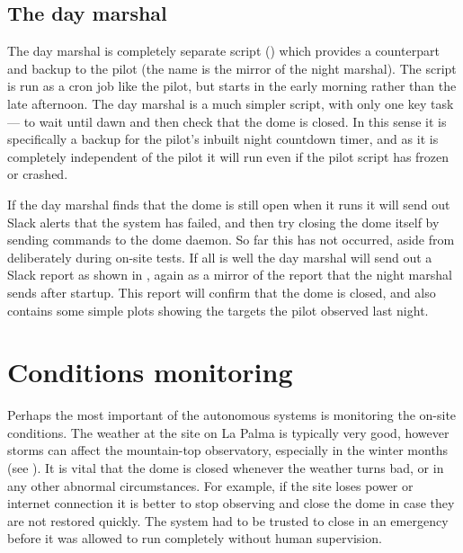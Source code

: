 
\subsection{The day marshal}
\label{sec:day_marshal}
\begin{colsection}

The day marshal is completely separate script () which provides a counterpart and backup to the pilot (the name is the mirror of the night marshal). The script is run as a cron job like the pilot, but starts in the early morning rather than the late afternoon. The day marshal is a much simpler script, with only one key task --- to wait until dawn and then check that the dome is closed. In this sense it is specifically a backup for the pilot's inbuilt night countdown timer, and as it is completely independent of the pilot it will run even if the pilot script has frozen or crashed.

If the day marshal finds that the dome is still open when it runs it will send out Slack alerts that the system has failed, and then try closing the dome itself by sending commands to the dome daemon. So far this has not occurred, aside from deliberately during on-site tests. If all is well the day marshal will send out a Slack report as shown in , again as a mirror of the report that the night marshal sends after startup. This report will confirm that the dome is closed, and also contains some simple plots showing the targets the pilot observed last night.

\end{colsection}


\section{Conditions monitoring}
\label{sec:conditions}


\begin{colsection}

Perhaps the most important of the autonomous systems is monitoring the on-site conditions. The weather at the site on La Palma is typically very good, however storms can affect the mountain-top observatory, especially in the winter months (see ). It is vital that the dome is closed whenever the weather turns bad, or in any other abnormal circumstances. For example, if the site loses power or internet connection it is better to stop observing and close the dome in case they are not restored quickly. The system had to be trusted to close in an emergency before it was allowed to run completely without human supervision.

\end{colsection}

